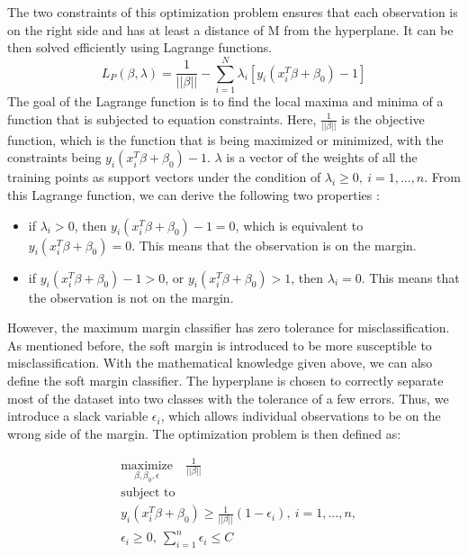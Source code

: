 The two constraints of this optimization problem ensures that each observation is on the right side
and has at least a distance of M from the hyperplane. It can be then solved efficiently using
Lagrange functions.
\begin{equation}
    L_P(\beta, \lambda) = \frac 1 {||\beta||} - \sum_{i=1}^N \lambda_i [ y_i (x_i^T \beta + \beta_0) - 1 ]
\end{equation}
The goal of the Lagrange function is to find the local maxima and minima of a function
that is subjected to equation constraints.
Here, $\frac 1 {||\beta||}$ is the objective function, which is the function that is being 
maximized or minimized, with the constraints being
$y_i(x_i^T \beta + \beta_0) - 1$. $\lambda$ is a vector of the weights of all the training points as support vectors
under the condition of $\lambda_i \geq 0,\ i = 1, ..., n$. From this Lagrange function, we can
derive the following two properties \cite{Elements4}:
\begin{itemize}
    \item if $\lambda_i > 0$, then $y_i(x_i^T\beta + \beta_0) - 1 = 0$, which is equivalent to
    $y_i(x_i^T\beta + \beta_0) = 0$. This means that the observation is on the margin.
    \item if $y_i(x_i^T\beta + \beta_0) - 1 > 0$, or $y_i(x_i^T\beta + \beta_0) > 1$, then
    $\lambda_i = 0$. This means that the observation is not on the margin.
  \end{itemize}




However, the maximum margin classifier has zero tolerance for misclassification. As mentioned before,
the soft margin is introduced to be more susceptible to misclassification. With the mathematical knowledge
given above, we can also define the soft margin classifier. The hyperplane
is chosen to correctly separate most of the dataset into two classes with the tolerance of a few errors.
Thus, we introduce a slack variable $\epsilon_i$, which allows individual observations to be on the wrong side 
of the margin.
The optimization problem is then defined as\cite{R9}:

\begin{equation}
    \begin{aligned}
      & \underset{\textstyle {\beta, \beta_0, \epsilon}}{\text{maximize}} \quad
        \frac 1 {||\beta||} \\
      & \text{subject to} \\
      & y_i(x_i^T \beta + \beta_0) \geq \frac{1}{||\beta||}(1-\epsilon_i),\ i = 1, ..., n, \\
      & \epsilon_i \geq 0, \ \sum_{i=1}^n \epsilon_i \leq C
    \end{aligned}
\end{equation}

